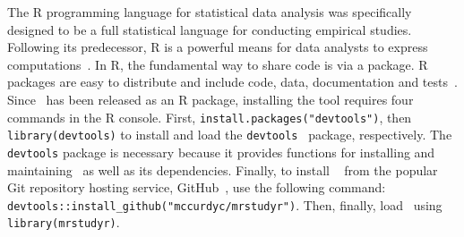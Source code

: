 The R programming language for statistical data analysis was specifically designed to be a full statistical language for
conducting empirical studies. Following its predecessor, R is a powerful means for data analysts to express
computations~\cite{ihaka1996r}.  In R, the fundamental way to share code is via a package.  R packages are easy to
distribute and include code, data, documentation and tests~\cite{wickham2015r}.  Since \mr~has been released as an R
package, installing the tool requires four commands in the R console.  First, \texttt{install.packages("devtools")},
then {\small\texttt{library(devtools)}} to install and load the {\small\texttt{devtools}}~\cite{devtools} package,
respectively.  The \texttt{devtools} package is necessary because it provides functions for installing and maintaining
\mr~as well as its dependencies.  Finally, to install \mr~\cite{tool} from the popular Git repository hosting service,
GitHub~\cite{github}, use the following command: {\small\texttt{devtools::install\_github("mccurdyc/mrstudyr")}}.  Then,
finally, load \mr~using \texttt{library(mrstudyr)}.



